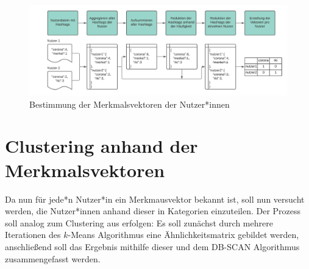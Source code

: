 \begin{figure}[h]
	\centering
	\includegraphics[width=\linewidth]{images/vergehen_merkmalsvektoren_nutzer}
	\caption{Bestimmung der Merkmalsvektoren der Nutzer*innen}
	\label{fig:merkmalsvektoren}
\end{figure}
\section{Clustering anhand der Merkmalsvektoren}
Da nun für jede*n Nutzer*in ein Merkmausvektor bekannt ist, soll nun versucht werden, die Nutzer*innen anhand dieser in Kategorien einzuteilen. Der Prozess soll analog zum Clustering aus \cite{Godfrey.21.08.2014} erfolgen: Es soll zunächst durch mehrere Iterationen des $k$-Means Algorithmus eine Ähnlichkeitsmatrix gebildet werden, anschließend soll das Ergebnis mithilfe dieser und dem DB-SCAN Algorithmus zusammengefasst werden. 
